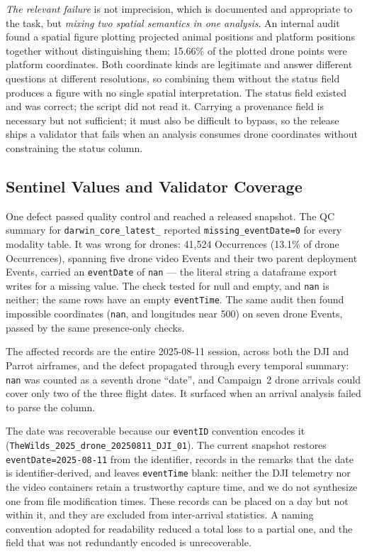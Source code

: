 \documentclass[sigconf]{acmart}
\begin{document}
\emph{The relevant failure} is not imprecision, which is documented and
appropriate to the task, but \emph{mixing two spatial semantics in one
analysis}. An internal audit found a spatial figure plotting projected
animal positions and platform positions together without distinguishing
them; 15.66\% of the plotted drone points were platform coordinates.
Both coordinate kinds are legitimate and answer different questions at
different resolutions, so combining them without the status field
produces a figure with no single spatial interpretation. The status field existed and was correct;
the script did not read it. Carrying a provenance field is necessary but
not sufficient; it must also be difficult to bypass, so the release
ships a validator that fails when an analysis consumes drone coordinates
without constraining the status column.

\subsection{Sentinel Values and Validator Coverage}
\label{sec:nulldefect}

One defect passed quality control and reached a released snapshot. The QC summary for \texttt{darwin\_core\_\allowbreak latest\_}
reported \texttt{missing\_\allowbreak eventDate=0} for every modality
table. It was wrong for drones: 41{,}524 Occurrences (13.1\% of drone
Occurrences), spanning five drone video Events and their two parent
deployment Events, carried an \texttt{eventDate} of \texttt{nan} --- the
literal string a dataframe export writes for a missing value. The check
tested for null and empty, and \texttt{nan} is neither; the same rows
have an empty \texttt{eventTime}. The same audit then found impossible
coordinates (\texttt{nan}, and longitudes near 500) on seven drone
Events, passed by the same presence-only checks.

The affected records are the entire 2025-08-11 session, across both the
DJI and Parrot airframes, and the defect propagated through every
temporal summary: \texttt{nan} was counted as a seventh drone ``date'',
and Campaign~2 drone arrivals could cover only two of the three flight
dates. It surfaced when an arrival analysis failed to parse the column.

The date was recoverable because our \texttt{eventID} convention encodes
it (\texttt{TheWilds\_2025\_drone\_20250811\_DJI\_01}). The current
snapshot restores \texttt{eventDate=2025-08-11} from the identifier,
records in the remarks that the date is identifier-derived, and leaves
\texttt{eventTime} blank: neither the DJI telemetry nor the video
containers retain a trustworthy capture time, and we do not synthesize
one from file modification times. These records can be placed on a day
but not within it, and they are excluded from inter-arrival
statistics. A naming convention adopted for readability reduced a total
loss to a partial one, and the field that was not redundantly encoded is
unrecoverable.
\end{document}
